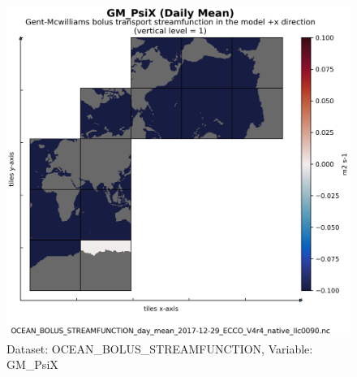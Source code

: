 \begin{figure}[H]
\centering
\includegraphics[scale=0.55]{../images/plots/native_plots/Gent-McWilliams_Bolus_Transport_Streamfunction/GM_PsiX.png}
\caption{Dataset: OCEAN\_BOLUS\_STREAMFUNCTION, Variable: GM\_PsiX}
\label{tab:table-OCEAN_BOLUS_STREAMFUNCTION_GM_PsiX-Plot}
\end{figure}
\newpage
\pagebreak
